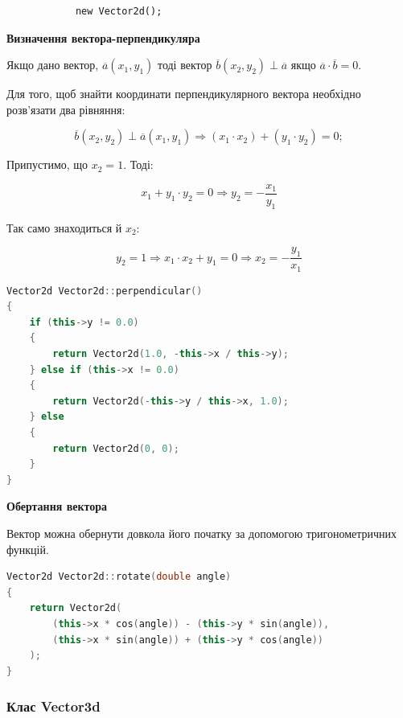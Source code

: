 \documentclass[simple,a4paper,14pt,ukrainian,utf8]{eskdtext}
\begin{document}
            \begin{lstlisting}
            new Vector2d(); 
            \end{lstlisting}     	
     	
	     	\textbf{Визначення вектора-перпендикуляра}
	     	
	     	Якщо дано вектор, $\overline{a} (x_1, y_1)$ тоді вектор $\overline{b} (x_2, y_2) \perp \overline{a}$ якщо $\overline{a} \cdot \overline{b} = 0$.
	     	
	     	Для того, щоб знайти координати перпендикулярного вектора необхідно розв’язати два рівняння:
	     	
	     	$$
	     		\overline{b}(x_2, y_2) \perp \overline{a}(x_1, y_1) \Rightarrow (x_1 \cdot x_2) + (y_1 \cdot y_2) = 0;
	     	$$
	     	
			Припустимо, що $x_2 = 1$. Тоді:
	     	
	     	$$
	     		x_1 + y_1 \cdot y_2 = 0 \Rightarrow y_2 = -\frac{x_1}{y_1}
	     	$$
	     	
	     	Так само знаходиться й $x_2$:
	     	
	     	$$
	     		y_2 = 1 \Rightarrow x_1 \cdot x_2 + y_1 = 0 \Rightarrow x_2 = -\frac{y_1}{x_1}
	     	$$
	     	
\begin{small}
\begin{lstlisting}[language=C++]
Vector2d Vector2d::perpendicular()
{
    if (this->y != 0.0)
    {
        return Vector2d(1.0, -this->x / this->y);
    } else if (this->x != 0.0)
    {
        return Vector2d(-this->y / this->x, 1.0);
    } else
    {
        return Vector2d(0, 0);
    }
}
\end{lstlisting}
\end{small}
	     	
	    \textbf{Обертання вектора}
	    
	    Вектор можна обернути довкола його початку за допомогою тригонометричних функцій.
	    
\begin{small}
\begin{lstlisting}[language=C++]
Vector2d Vector2d::rotate(double angle)
{
    return Vector2d(
        (this->x * cos(angle)) - (this->y * sin(angle)),
        (this->x * sin(angle)) + (this->y * cos(angle))
    );
}
\end{lstlisting}
\end{small}
     	
    	\subsubsection{Клас Vector3d}
\end{document}
